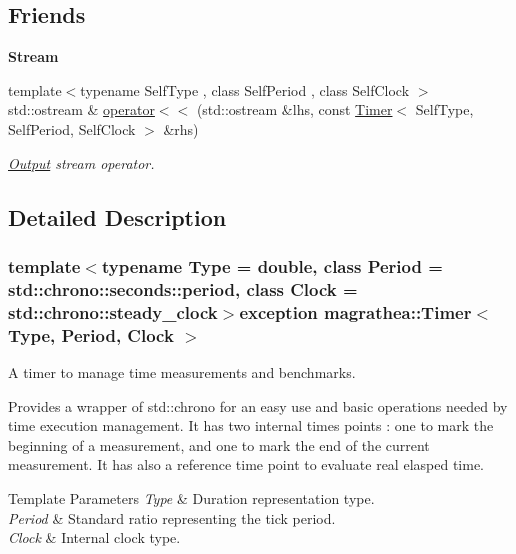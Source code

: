 \subsection*{Friends}
\begin{Indent}{\bf Stream}\par
\begin{DoxyCompactItemize}
\item 
{\footnotesize template$<$typename Self\-Type , class Self\-Period , class Self\-Clock $>$ }\\std\-::ostream \& \hyperlink{exceptionmagrathea_1_1Timer_a9b9e2a214358571c47b7159572accf67}{operator$<$$<$} (std\-::ostream \&lhs, const \hyperlink{exceptionmagrathea_1_1Timer}{Timer}$<$ Self\-Type, Self\-Period, Self\-Clock $>$ \&rhs)
\begin{DoxyCompactList}\small\item\em \hyperlink{exceptionOutput}{Output} stream operator. \end{DoxyCompactList}\end{DoxyCompactItemize}
\end{Indent}


\subsection{Detailed Description}
\subsubsection*{template$<$typename Type = double, class Period = std\-::chrono\-::seconds\-::period, class Clock = std\-::chrono\-::steady\-\_\-clock$>$exception magrathea\-::\-Timer$<$ Type, Period, Clock $>$}

A timer to manage time measurements and benchmarks. 

Provides a wrapper of {\ttfamily std\-::chrono} for an easy use and basic operations needed by time execution management. It has two internal times points \-: one to mark the beginning of a measurement, and one to mark the end of the current measurement. It has also a reference time point to evaluate real elasped time. 
\begin{DoxyTemplParams}{Template Parameters}
{\em Type} & Duration representation type. \\
\hline
{\em Period} & Standard ratio representing the tick period. \\
\hline
{\em Clock} & Internal clock type. \\
\hline
\end{DoxyTemplParams}


